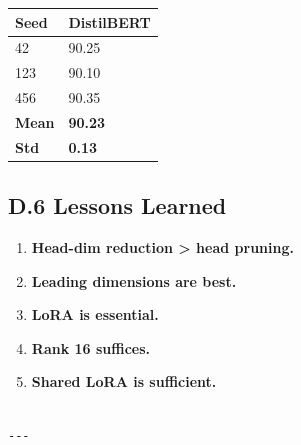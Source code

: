 \begin{table}[H]
\centering
\small
\begin{tabular}{ll}
\toprule
\textbf{Seed} & \textbf{DistilBERT} \\
\midrule
42 & 90.25 \\
123 & 90.10 \\
456 & 90.35 \\
\textbf{Mean} & \textbf{90.23} \\
\textbf{Std} & \textbf{0.13} \\
\bottomrule
\end{tabular}
\end{table}

\subsection{D.6 Lessons Learned}

\begin{enumerate}
\item \textbf{Head-dim reduction \textgreater{} head pruning.}
\item \textbf{Leading dimensions are best.}
\item \textbf{LoRA is essential.}
\item \textbf{Rank 16 suffices.}
\item \textbf{Shared LoRA is sufficient.}
\end{enumerate}
\begin{lstlisting}

---
\end{lstlisting}